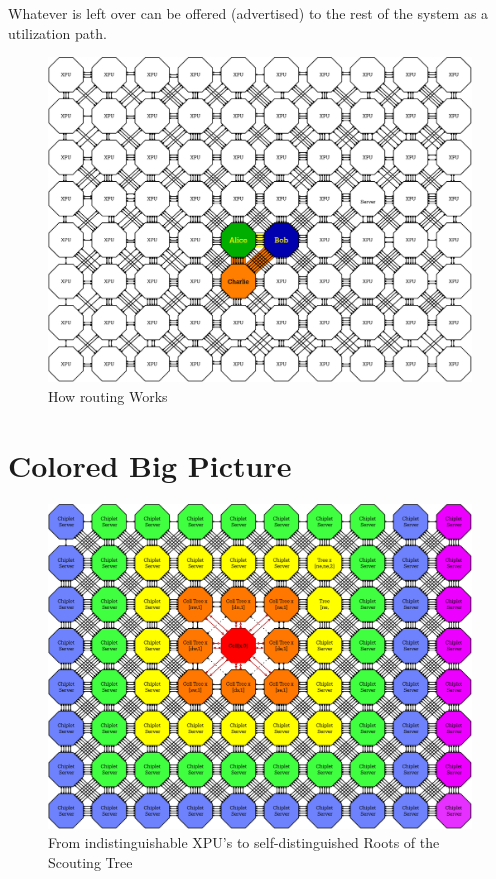 Whatever is left over can be offered (advertised) to the rest of the system as a utilization path.

 \begin{figure}[h]
  \includegraphics[width=1.6\linewidth]{../../FIGURES/One-Link.pdf}
   \caption{ How routing Works}
      \vspace{2em}
\end{figure}

\clearpage

\section{Colored Big Picture}
 \begin{figure}[h]
  \includegraphics[width=1.6\linewidth]{../../FIGURES/Chiplet-Colors.pdf}
   \caption{From indistinguishable XPU's to self-distinguished Roots of the Scouting Tree}
      \vspace{2em}
\end{figure}


